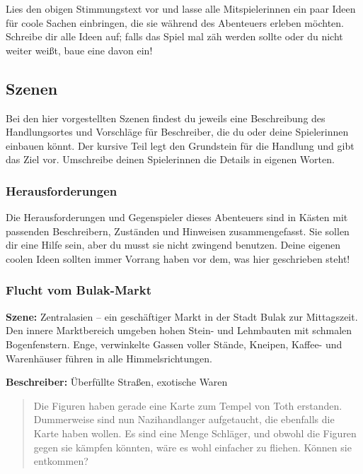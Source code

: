 \documentclass[]{article}
\begin{document}
Lies den obigen Stimmungstext vor und lasse alle Mitspielerinnen ein
paar Ideen für coole Sachen einbringen, die sie während des Abenteuers
erleben möchten. Schreibe dir alle Ideen auf; falls das Spiel mal zäh
werden sollte oder du nicht weiter weißt, baue eine davon ein!

\subsection{Szenen}\label{szenen}

Bei den hier vorgestellten Szenen findest du jeweils eine Beschreibung
des Handlungsortes und Vorschläge für Beschreiber, die du oder deine
Spielerinnen einbauen könnt. Der kursive Teil legt den Grundstein für
die Handlung und gibt das Ziel vor. Umschreibe deinen Spielerinnen die
Details in eigenen Worten.

\subsubsection{Herausforderungen}\label{herausforderungen}

Die Herausforderungen und Gegenspieler dieses Abenteuers sind in Kästen
mit passenden Beschreibern, Zuständen und Hinweisen zusammengefasst. Sie
sollen dir eine Hilfe sein, aber du musst sie nicht zwingend benutzen.
Deine eigenen coolen Ideen sollten immer Vorrang haben vor dem, was hier
geschrieben steht!

\subsubsection{Flucht vom Bulak-Markt}\label{flucht-vom-bulak-markt}

\textbf{Szene:} Zentralasien -- ein geschäftiger Markt in der Stadt
Bulak zur Mittagszeit. Den innere Marktbereich umgeben hohen Stein- und
Lehmbauten mit schmalen Bogenfenstern. Enge, verwinkelte Gassen voller
Stände, Kneipen, Kaffee- und Warenhäuser führen in alle
Himmelsrichtungen.

\textbf{Beschreiber:} Überfüllte Straßen, exotische Waren

\begin{quote}
Die Figuren haben gerade eine Karte zum Tempel von Toth erstanden.
Dummerweise sind nun Nazihandlanger aufgetaucht, die ebenfalls die Karte
haben wollen. Es sind eine Menge Schläger, und obwohl die Figuren gegen
sie kämpfen könnten, wäre es wohl einfacher zu fliehen. Können sie
entkommen?
\end{quote}
\end{document}
